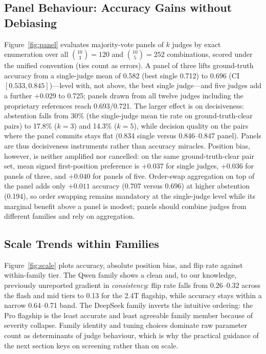 \documentclass[review,12pt]{elsarticle}
\begin{document}
\subsection{Panel Behaviour: Accuracy Gains without Debiasing}
\label{sec:res-panel}

Figure~\ref{fig:panel} evaluates majority-vote panels of $k$ judges by
exact enumeration over all $\binom{10}{3}=120$ and $\binom{10}{5}=252$
combinations, scored under the unified convention (ties count as errors).
A panel of three lifts ground-truth accuracy from a single-judge mean of
0.582 (best single 0.712) to 0.696 (CI $[0.533, 0.845]$)---level with,
not above, the best single judge---and five judges add a further $+0.029$
to 0.725; panels drawn from all twelve judges including the proprietary
references reach 0.693/0.721. The larger effect is on decisiveness:
abstention falls from 30\% (the single-judge mean tie rate on
ground-truth-clear pairs) to 17.8\% ($k=3$) and 14.3\% ($k=5$), while
decision quality on the pairs where the panel commits stays flat (0.834
single versus 0.846--0.847 panel). Panels are thus decisiveness
instruments rather than accuracy miracles. Position bias, however, is
neither amplified nor cancelled: on the same ground-truth-clear pair set,
mean signed first-position preference is $+0.037$ for single judges,
$+0.036$ for panels of three, and $+0.040$ for panels of five.
Order-swap aggregation on top of the panel adds only $+0.011$ accuracy
(0.707 versus 0.696) at higher abstention (0.194), so order swapping
remains mandatory at the single-judge level while its marginal benefit
above a panel is modest; panels should combine judges from different
families and rely on
aggregation.

\subsection{Scale Trends within Families}
\label{sec:res-scale}

Figure~\ref{fig:scale} plots accuracy, absolute position bias, and flip
rate against within-family tier. The Qwen family shows a clean and, to our
knowledge, previously unreported gradient in \emph{consistency}: flip rate
falls from 0.26--0.32 across the flash and mid tiers to 0.13 for the 2.4T
flagship, while accuracy stays within a narrow 0.64--0.71 band. The DeepSeek family inverts the intuitive ordering: the
Pro flagship is the least accurate and least agreeable family member
because of severity collapse. Family identity and tuning choices dominate
raw parameter count as determinants of judge behaviour, which is why the
practical guidance of the next section keys on screening rather than on
scale.
\end{document}
